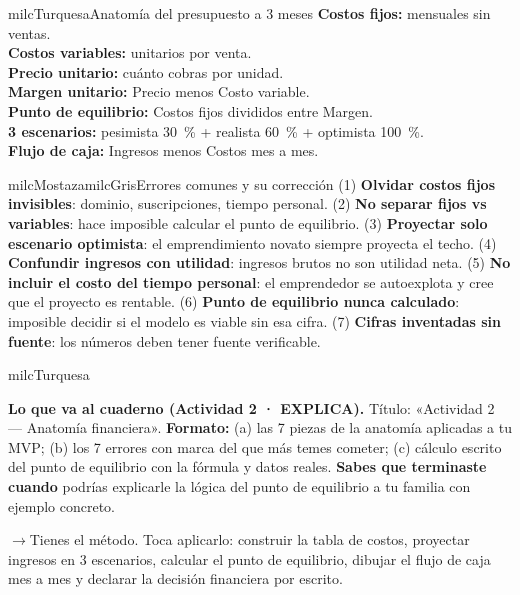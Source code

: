 \documentclass[11pt,letterpaper]{article}
\newcommand{\puente}[1]{%
  \begin{puentebox}%
    \textcolor{milcGradeDark}{$\rightarrow$}\hspace{2mm}#1%
  \end{puentebox}%
}
\begin{document}
\begin{drawbox}{milcTurquesa}{Anatomía del presupuesto a 3 meses}
\textbf{Costos fijos:} mensuales sin ventas. \\[1mm] \textbf{Costos variables:} unitarios por venta. \\[1mm] \textbf{Precio unitario:} cuánto cobras por unidad. \\[1mm] \textbf{Margen unitario:} Precio menos Costo variable. \\[1mm] \textbf{Punto de equilibrio:} Costos fijos divididos entre Margen. \\[1mm] \textbf{3 escenarios:} pesimista 30~\% + realista 60~\% + optimista 100~\%. \\[1mm] \textbf{Flujo de caja:} Ingresos menos Costos mes a mes.
\end{drawbox}

\begin{softbox}{milcMostaza}{milcGris}{Errores comunes y su corrección}
(1) \textbf{Olvidar costos fijos invisibles}: dominio, suscripciones, tiempo personal. (2) \textbf{No separar fijos vs variables}: hace imposible calcular el punto de equilibrio. (3) \textbf{Proyectar solo escenario optimista}: el emprendimiento novato siempre proyecta el techo. (4) \textbf{Confundir ingresos con utilidad}: ingresos brutos no son utilidad neta. (5) \textbf{No incluir el costo del tiempo personal}: el emprendedor se autoexplota y cree que el proyecto es rentable. (6) \textbf{Punto de equilibrio nunca calculado}: imposible decidir si el modelo es viable sin esa cifra. (7) \textbf{Cifras inventadas sin fuente}: los números deben tener fuente verificable.
\end{softbox}

\begin{infoband}{milcTurquesa}


\textbf{Lo que va al cuaderno (Actividad 2 · EXPLICA).} Título: «Actividad 2 --- Anatomía financiera». \textbf{Formato:} (a) las 7 piezas de la anatomía aplicadas a tu MVP; (b) los 7 errores con marca del que más temes cometer; (c) cálculo escrito del punto de equilibrio con la fórmula y datos reales. \textbf{Sabes que terminaste cuando} podrías explicarle la lógica del punto de equilibrio a tu familia con ejemplo concreto.
\end{infoband}

\puente{Tienes el método. Toca aplicarlo: construir la tabla de costos, proyectar ingresos en 3 escenarios, calcular el punto de equilibrio, dibujar el flujo de caja mes a mes y declarar la decisión financiera por escrito.}
\end{document}
